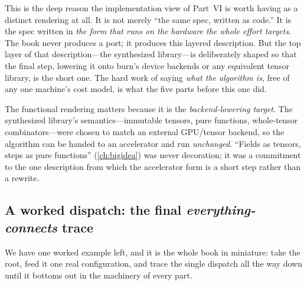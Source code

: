 This is the deep reason the implementation view of Part~VI is worth having as a
distinct rendering at all. It is not merely ``the same spec, written as code.'' It is
the spec written in \emph{the form that runs on the hardware the whole effort
targets}. The book never produces a port; it produces this layered description. But the
top layer of that description---the synthesized library---is deliberately shaped so
that the final step, lowering it onto burn's device backends or any equivalent
tensor library, is the short one. The hard work of saying \emph{what the algorithm
is}, free of any one machine's cost model, is what the five parts before this one did.

\begin{keyidea}
The functional rendering matters because it is the \emph{backend-lowering target}. The
synthesized library's semantics---immutable tensors, pure functions, whole-tensor
combinators---were chosen to match an external GPU/tensor backend, so the algorithm can
be handed to an accelerator and run \emph{unchanged}. ``Fields as tensors, steps as
pure functions'' (\cref{ch:bigidea}) was never decoration; it was a commitment to the
one description from which the accelerator form is a short step rather than a rewrite.
\end{keyidea}

\subsection{A worked dispatch: the final \emph{everything-connects} trace}
\label{sec:wm-worked}

We have one worked example left, and it is the whole book in miniature: take the
 root, feed it one real configuration, and trace the single dispatch
all the way down until it bottoms out in the machinery of every part.


